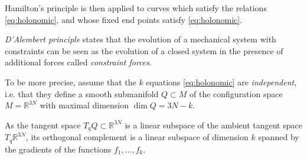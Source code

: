 \documentclass[english,fontsize=11pt,paper=a5,oneside]{scrbook}
\newcommand{\R}{\mathbb{R}}
\theoremstyle{definition}
\begin{document}
Hamilton's principle is then applied to curves which satisfy the relations \eqref{eq:holonomic}, and whose fixed end points satisfy \eqref{eq:holonomic}.

\begin{tcolorbox}
    \emph{D'Alembert principle} states that the evolution of a mechanical system with constraints can be seen as the evolution of a closed system in the presence of additional forces called \emph{constraint forces}.
\end{tcolorbox}

To be more precise, assume that the $k$ equations \eqref{eq:holonomic} are \emph{independent}, i.e. that they define a smooth submanifold $Q\subset M$ of the configuration space $M=\R^{3N}$ with maximal dimension $\dim Q = 3N-k$.

As the tangent space $T_qQ \subset \R^{3N}$ is a linear subspace of the ambient tangent space $T_q \R^{3N}$, its orthogonal complement is a linear subspace of dimension $k$ spanned by the gradients of the functions $f_1, \ldots,f_k$.
\end{document}
